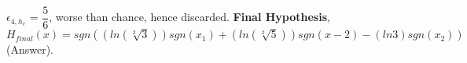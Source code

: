 \documentclass{article}
\begin{document}
  $\epsilon_{4,h_{c}}$ = $\dfrac{5}{6}$, worse than chance, hence discarded. \newline
  \textbf {Final Hypothesis}, $H_{final}(x) =  sgn( (ln(\sqrt[2]{3}))sgn(x_{1}) + (ln(\sqrt[2]{5}))sgn(x-2) - (ln3)sgn(x_{2}))$ (Answer).


  
  
	
    
    
\end{document}

